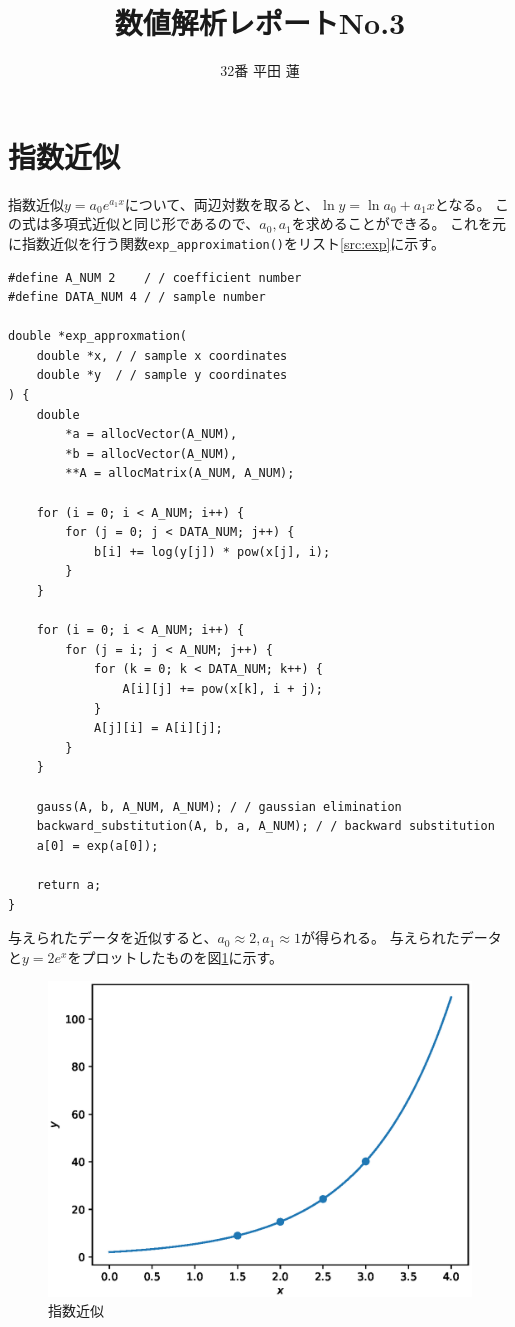 \documentclass{jsarticle}
\title{数値解析レポートNo.3}
\author{32番 平田 蓮}
\date{}
\begin{document}
\maketitle
    \section{指数近似}
        指数近似$y = a_0e^{a_1x}$について、両辺対数を取ると、$\ln y = \ln a_0 + a_1x$となる。
        この式は多項式近似と同じ形であるので、$a_0, a_1$を求めることができる。
        これを元に指数近似を行う関数\verb|exp_approximation()|をリスト\ref{src:exp}に示す。

        \begin{lstlisting}[caption=exp\_approximation, label=src:exp]
#define A_NUM 2    / / coefficient number
#define DATA_NUM 4 / / sample number

double *exp_approxmation(
    double *x, / / sample x coordinates
    double *y  / / sample y coordinates
) {
    double
        *a = allocVector(A_NUM),
        *b = allocVector(A_NUM),
        **A = allocMatrix(A_NUM, A_NUM);

    for (i = 0; i < A_NUM; i++) {
        for (j = 0; j < DATA_NUM; j++) {
            b[i] += log(y[j]) * pow(x[j], i);
        }
    }

    for (i = 0; i < A_NUM; i++) {
        for (j = i; j < A_NUM; j++) {
            for (k = 0; k < DATA_NUM; k++) {
                A[i][j] += pow(x[k], i + j);
            }
            A[j][i] = A[i][j];
        }
    }

    gauss(A, b, A_NUM, A_NUM); / / gaussian elimination
    backward_substitution(A, b, a, A_NUM); / / backward substitution
    a[0] = exp(a[0]);

    return a;
}\end{lstlisting}

        与えられたデータを近似すると、$a_0 \approx 2, a_1 \approx 1$が得られる。
        与えられたデータと$y = 2e^x$をプロットしたものを図\ref{fig:exp}に示す。

        \begin{figure}[h]
            \centering
            \includegraphics[width=0.8\hsize]{img/exp.eps}
            \caption{指数近似}
            \label{fig:exp}
        \end{figure}
\end{document}
